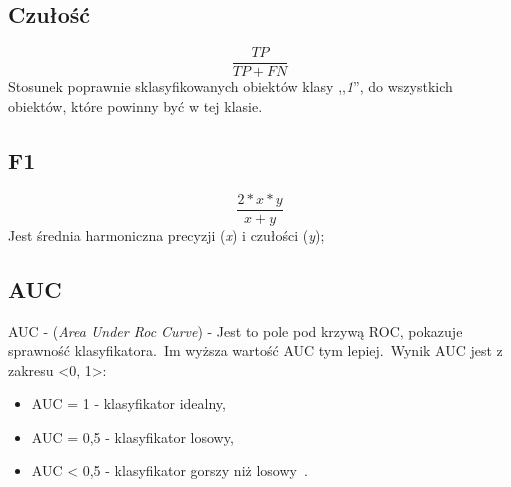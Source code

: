 \subsection{Czułość}
\begin{equation}\label{math:rec}
    \frac{TP}{TP + FN}
\end{equation}
Stosunek poprawnie sklasyfikowanych obiektów klasy ,,\textit{1}'', do wszystkich obiektów, które powinny być w tej klasie.

\subsection{F1}
\begin{equation}\label{math:f1}
   \frac{2*x*y}{x + y}
\end{equation}
Jest średnia harmoniczna precyzji (\textit{x}) i czułości (\textit{y});


\subsection{AUC}
AUC - (\textit{Area Under Roc Curve}) - Jest to pole pod krzywą ROC, pokazuje sprawność klasyfikatora.\ Im wyższa wartość AUC tym lepiej.\ Wynik AUC jest z zakresu <0, 1>:
\begin{itemize}
    \item AUC = 1 - klasyfikator idealny,
    \item AUC = 0,5 - klasyfikator losowy,
    \item AUC < 0,5 - klasyfikator gorszy niż losowy~\cite{Algolytics}.
\end{itemize}
